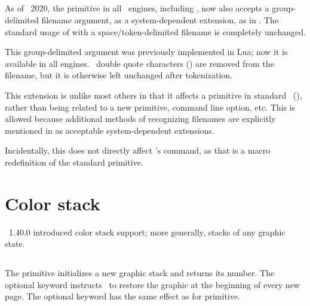 \documentclass{pdftexmanual}
\begin{document}
\subsection{}

As of \TEXLIVE\ 2020, the  primitive in all \TEX\ engines,
including \PDFTEX, now also accepts a group-delimited filename argument,
as a system-dependent extension, as in
\Lbrace{}\Rbrace. The standard usage of 
with a space/token-delimited filename is completely unchanged.

This group-delimited argument was previously implemented in Lua\TEX; now
it is available in all engines. \ASCII\ double quote characters
() are removed from the filename, but it is otherwise left
unchanged after tokenization.

This extension is unlike most others in that it affects a primitive in
standard \TEX\ (), rather than being related to a new
primitive, command line option, etc. This is allowed because additional
methods of recognizing filenames are explicitly mentioned in
 as acceptable system-dependent extensions.

Incidentally, this does not directly affect \LATEX's 
command, as that is a macro redefinition of the standard 
primitive.


\section{Color stack}

\PDFTEX\ 1.40.0 introduced color stack support; more generally, stacks
of any graphic state.

\subsection{}

The primitive initializes a new graphic stack and returns its number.
The optional  keyword instructs \PDFTEX\ to restore the
graphic at the beginning of every new page. The optional
 keyword has the same effect as for 
primitive. 
\end{document}
